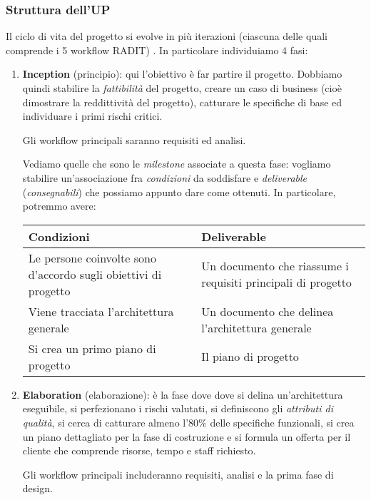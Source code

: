 \documentclass[a4paper,11pt]{article}
\begin{document}
\subsubsection{Struttura dell'UP}
Il ciclo di vita del progetto si evolve in più iterazioni (ciascuna delle quali comprende i 5 workflow RADIT)
.
In particolare individuiamo 4 fasi:
\begin{enumerate}
	\item \textbf{Inception} (principio): qui l'obiettivo è far partire il progetto. Dobbiamo quindi stabilire la \textit{fattibilità} del progetto, creare un caso di business (cioè dimostrare la reddittività del progetto), catturare le specifiche di base ed individuare i primi rischi critici. 

		Gli workflow principali saranno requisiti ed analisi. 

		Vediamo quelle che sono le \textit{milestone} associate a questa fase: vogliamo stabilire un'associazione fra \textit{condizioni} da soddisfare e \textit{deliverable} (\textit{consegnabili}) che possiamo appunto dare come ottenuti.
In particolare, potremmo avere: 
\begin{table}[H]
	\center {}
	\begin{tabular} { p{7cm} | p{7cm} }
		\bfseries Condizioni & \bfseries Deliverable \\
		\hline
		Le persone coinvolte sono d'accordo sugli obiettivi di progetto &
		Un documento che riassume i requisiti principali di progetto \\
		Viene tracciata l'architettura generale &
		Un documento che delinea l'architettura generale \\
		Si crea un primo piano di progetto & Il piano di progetto
	\end{tabular}
\end{table}

\item \textbf{Elaboration} (elaborazione): è la fase dove dove si delina un'architettura eseguibile, si perfezionano i rischi valutati, si definiscono gli \textit{attributi di qualità}, si cerca di catturare almeno l'80\% delle specifiche funzionali, si crea un piano dettagliato per la fase di costruzione e si formula un offerta per il cliente che comprende risorse, tempo e staff richiesto. 

	Gli workflow principali includeranno requisiti, analisi e la prima fase di design.


\end{enumerate}
\end{document}
